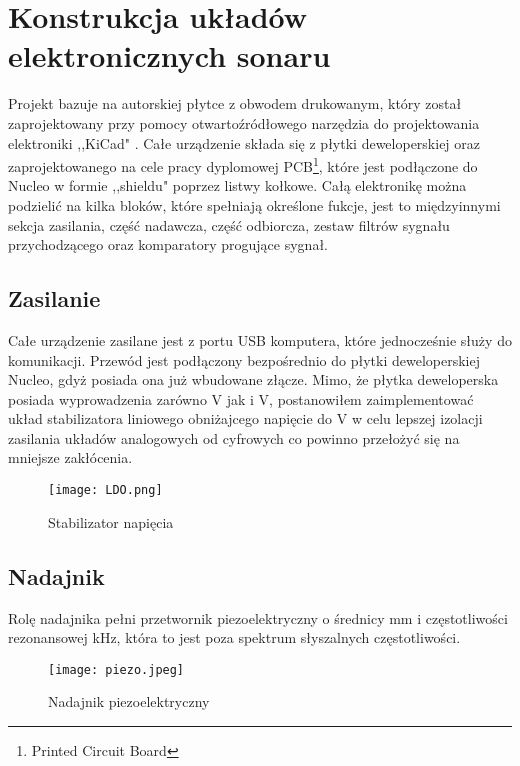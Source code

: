 \section{Konstrukcja układów elektronicznych sonaru}
Projekt bazuje na autorskiej płytce z obwodem drukowanym, który został zaprojektowany przy pomocy 
otwartoźródłowego narzędzia do projektowania elektroniki ,,KiCad" \cite{kicad}. 
Całe urządzenie składa się z płytki deweloperskiej oraz zaprojektowanego na cele pracy dyplomowej 
PCB\footnote[1]{Printed Circuit Board}, które
jest podłączone do Nucleo w formie ,,shieldu" poprzez listwy kołkowe.
Całą elektronikę można podzielić na kilka bloków, które spełniają określone fukcje, 
jest to międzyinnymi sekcja zasilania, część nadawcza, część odbiorcza, zestaw filtrów sygnału przychodzącego oraz komparatory progujące sygnał.

\subsection{Zasilanie}
Całe urządzenie zasilane jest z portu USB komputera, które jednocześnie służy do komunikacji. 
Przewód jest podłączony bezpośrednio do płytki deweloperskiej Nucleo, gdyż posiada ona już wbudowane złącze. 
Mimo, że płytka deweloperska posiada wyprowadzenia zarówno \unit[5]{V} jak i \unit[3,3]{V}, 
postanowiłem zaimplementować układ stabilizatora liniowego obniżajcego napięcie do \unit[3,3]{V} w celu lepszej izolacji zasilania układów analogowych od cyfrowych co powinno przełożyć się na mniejsze zakłócenia.
\begin{figure}[ht!]
    \centering
    \texttt{[image: LDO.png]}
    \caption{Stabilizator napięcia}
    \label{fig:ldo}
\end{figure}

\subsection{Nadajnik}
Rolę nadajnika pełni przetwornik piezoelektryczny o średnicy \unit[16]{mm} i częstotliwości rezonansowej \unit[40]{kHz}, która to jest poza spektrum słyszalnych częstotliwości.
\begin{figure}[ht!]
    \centering
    \texttt{[image: piezo.jpeg]}
    \caption{Nadajnik piezoelektryczny}
    \label{fig:piezo}
\end{figure}

